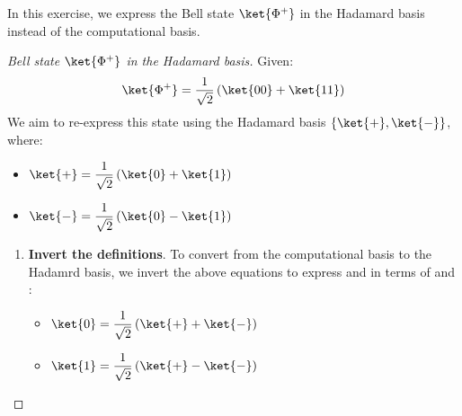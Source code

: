 \begin{examplebox}
    In this exercise, we express the Bell state $\ket{\Phi^{+}}$ in the Hadamard basis instead of the computational basis.

    \begin{proof}[Bell state $\ket{\Phi^{+}}$ in the Hadamard basis]
        Given:
        \begin{equation*}
            \ket{\Phi^{+}} = \dfrac{1}{\sqrt{2}}\left(\ket{00} + \ket{11}\right)
        \end{equation*}
        We aim to re-express this state using the Hadamard basis $\left\{\ket{+}, \ket{-}\right\}$, where:
        \begin{itemize}
            \item $\ket{+} = \dfrac{1}{\sqrt{2}} \left(\ket{0} + \ket{1}\right)$
            \item $\ket{-} = \dfrac{1}{\sqrt{2}} \left(\ket{0} - \ket{1}\right)$
        \end{itemize}
        \begin{enumerate}
            \item \textbf{Invert the definitions}. To convert from the computational basis to the Hadamrd basis, we invert the above equations to express  and  in terms of \ket{+} and \ket{-}:
            \begin{itemize}
                \item $\ket{0} = \dfrac{1}{\sqrt{2}} \left(\ket{+} + \ket{-}\right)$
                \item $\ket{1} = \dfrac{1}{\sqrt{2}} \left(\ket{+} - \ket{-}\right)$
            \end{itemize}


\end{enumerate}
\end{proof}
\end{examplebox}
